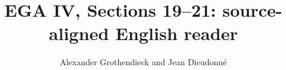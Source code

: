
\setlength{\emergencystretch}{3em}



\title{EGA IV, Sections 19--21: source-aligned English reader}
\author{Alexander Grothendieck and Jean Dieudonn\'e}
\date{}
\maketitle
\tableofcontents






